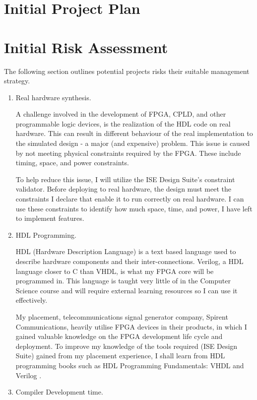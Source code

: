 \documentclass[11pt,a4paper]{article}
\begin{document}
\section{Initial Project Plan}

\section{Initial Risk Assessment}
The following section outlines potential projects risks their suitable management strategy.

\begin{enumerate}
\item{
Real hardware synthesis. 

A challenge involved in the development of FPGA, CPLD, and other programmable logic devices, is the realization of the HDL code on real hardware. This can result in different behaviour of the real implementation to the simulated design - a major (and expensive) problem. This issue is caused by not meeting physical constraints required by the FPGA. These include timing, space, and power constraints.

To help reduce this issue, I will utilize the ISE Design Suite's constraint validator. Before deploying to real hardware, the design must meet the constraints I declare that enable it to run correctly on real hardware. I can use these constraints to identify how much space, time, and power, I have left to implement features.
}
\item{
HDL Programming. 

HDL (Hardware Description Language) is a text based language used to describe hardware components and their inter-connections. Verilog, a HDL language closer to C than VHDL, is what my FPGA core will be programmed in. This language is taught very little of in the Computer Science course and will require external learning resources so I can use it effectively. 

My placement,  telecommunications signal generator company, Spirent Communications, heavily utilise FPGA devices in their products, in which I gained valuable knowledge on the FPGA development life cycle and deployment. To improve my knowledge of the tools required (ISE Design Suite) gained from my placement experience, I shall learn from HDL programming books such as HDL Programming Fundamentals: VHDL and Verilog \citep{hdl}.
}

\item{Compiler Development time. 

}
\end{enumerate}
\end{document}
